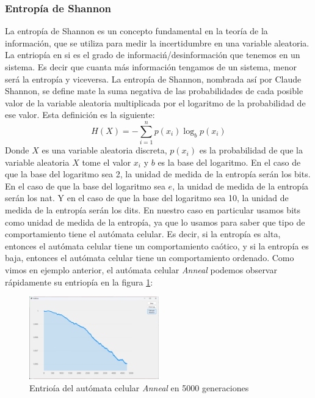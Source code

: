 \subsubsection{Entrop\'ia de Shannon}
\label{sec:Entriopia}
    La entrop\'ia de Shannon es un concepto fundamental en la teor\'ia de la informaci\'on, 
        que se utiliza para medir la incertidumbre en una variable aleatoria. La entriop\'ia en si 
        es el grado de informaci\'n/desinformaci\'on que tenemos en un sistema. Es decir que cuanta m\'as
        informaci\'on tengamos de un sistema, menor ser\'a la entrop\'ia y viceversa. La entrop\'ia de Shannon, 
        nombrada as\'i por Claude Shannon\cite{Shannon}, se define mate la suma negativa de las probabilidades de cada
        posible valor de la variable aleatoria multiplicada por el logaritmo de la probabilidad de ese valor. Esta
        definici\'on es la siguiente:
        \begin{equation}
            H(X) = -\sum_{i=1}^{n} p(x_i) \log_b p(x_i)
        \end{equation}
    \vskip 0.5cm
    Donde $X$ es una variable aleatoria discreta, $p(x_i)$ es la probabilidad de que la variable aleatoria 
        $X$ tome el valor $x_i$ y $b$ es la base del logaritmo. En el caso de que la base del logaritmo sea 2, 
        la unidad de medida de la entrop\'ia ser\'an los bits. En el caso de que la base del logaritmo sea $e$,
        la unidad de medida de la entrop\'ia ser\'an los nat. Y en el caso de que la base del logaritmo sea 10, 
        la unidad de medida de la entrop\'ia ser\'an los dits.
    \vskip 0.5cm
    En nuestro caso en particular usamos bits como unidad de medida de la entrop\'ia, ya que lo usamos para saber que tipo de comportamiento
        tiene el aut\'omata celular. Es decir, si la entrop\'ia es alta, entonces el aut\'omata celular tiene un comportamiento ca\'otico, y si 
        la entrop\'ia es baja, entonces el aut\'omata celular tiene un comportamiento ordenado.
    \vskip 0.5cm
    Como vimos en ejemplo anterior, el aut\'omata celular \textit{Anneal} podemos observar r\'apidamente su entriop\'ia
        en la figura \ref{fig:annealEntropia}: 
        \begin{figure}[h]
            \centering
            \includegraphics[width=0.5\textwidth]{./images/marco_teorico/automatas_celulares/Anneal5kShann.png}
            \caption{Entrio\'ia del aut\'omata celular \textit{Anneal} en 5000 generaciones}
            \label{fig:annealEntropia}  
        \end{figure}